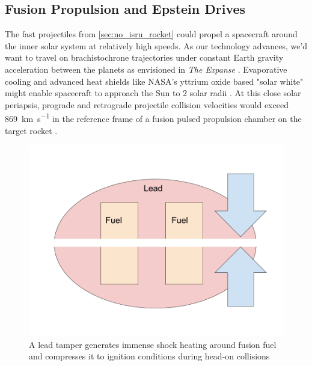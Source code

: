 \documentclass{article}
\begin{document}
\subsection{Fusion Propulsion and Epstein Drives}\label{sec:epstein_drives}
The fast projectiles from \autoref{sec:no_isru_rocket} could propel a spacecraft around the inner solar system at relatively high speeds.   As our technology advances, we'd want to travel on brachistochrone trajectories under constant Earth gravity acceleration between the planets as envisioned in \textit{The Expanse} \cite{Corey2012Drive}.  Evaporative cooling and advanced heat shields like NASA's yttrium oxide based "solar white" might  enable spacecraft to approach the Sun to 2 solar radii \cite{ted_ed_2025_how_close}.  At this close solar periapsis, prograde and retrograde projectile collision velocities would exceed \SI{869}{\kilo\meter\per\second} \cite{github_repo_for_paper} in the reference frame of a fusion pulsed propulsion chamber on the target rocket \cite{ted_ed_2025_how_close}.  

\begin{figure}[htpb]
    \centering
    \includegraphics[width=0.5\linewidth]{images/Fusion Impactors.png}
    \caption{A lead tamper generates immense shock heating around fusion fuel and compresses it to ignition conditions during head-on collisions}
    \label{fig:fusion_tamper}
\end{figure}
\end{document}
